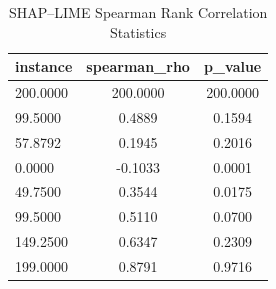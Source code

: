 \begin{table}
\centering
\caption{SHAP–LIME Spearman Rank Correlation Statistics}
\label{tab:agreement}
\begin{tabular}{lcc}
\toprule
instance & spearman_rho & p_value \\
\midrule
200.0000 & 200.0000 & 200.0000 \\
99.5000 & 0.4889 & 0.1594 \\
57.8792 & 0.1945 & 0.2016 \\
0.0000 & -0.1033 & 0.0001 \\
49.7500 & 0.3544 & 0.0175 \\
99.5000 & 0.5110 & 0.0700 \\
149.2500 & 0.6347 & 0.2309 \\
199.0000 & 0.8791 & 0.9716 \\
\bottomrule
\end{tabular}
\end{table}
